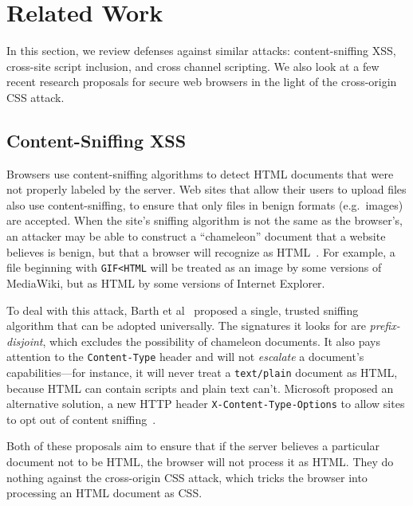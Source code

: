 \documentclass{sig-alternate}
\begin{document}
\section{Related Work} \label{sec:relatedwork}
In this section, we review defenses against
similar attacks: content-sniffing XSS, cross-site script inclusion, and cross
channel scripting.  We also look at a few recent research proposals for
secure web browsers in the light of the cross-origin CSS attack.

\subsection{Content-Sniffing XSS}
Browsers use content-sniffing algorithms to detect HTML documents that
were not properly labeled by the server. Web sites that allow their users to upload
files also use content-sniffing, to ensure that only files in benign
formats (e.g.\ images) are accepted.  When the site's sniffing
algorithm is not the same as the browser's, an attacker may be able to
construct a “chameleon” document that a website believes is benign,
but that a browser will recognize as
HTML~\cite{securecontentsniffing}.  For example, a file beginning with
\verb|GIF<HTML| will be treated as an image by some versions of
MediaWiki, but as HTML by some versions of Internet Explorer.

To deal with this attack, Barth et al~\cite{securecontentsniffing} proposed a
single, trusted sniffing algorithm that can be adopted universally.
The signatures it looks for are \emph{prefix-disjoint}, which excludes
the possibility of chameleon documents.  It also pays attention to the
\texttt{Content-Type} header and will not \emph{escalate} a document's
capabilities---for instance, it will never treat a \verb|text/plain|
document as HTML, because HTML can contain scripts and plain text
can't.  Microsoft proposed an alternative solution, a new HTTP header
\verb|X-Content-Type-Options| to allow sites to opt out of content
sniffing~\cite{nosniff}.

Both of these proposals aim to ensure that if the server believes a
particular document not to be HTML, the browser will not process it as
HTML.  They do nothing against the cross-origin CSS attack, which
tricks the browser into processing an HTML document as CSS.
\end{document}

